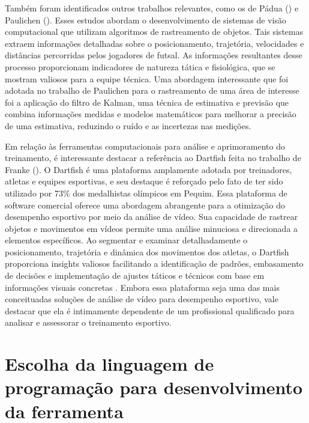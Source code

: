 Também foram identificados outros trabalhos relevantes, como os de Pádua (\citeyear{vcFutebol}) e Paulichen (\citeyear{futebolTatica}). Esses estudos abordam o desenvolvimento de sistemas de visão computacional que utilizam algoritmos de rastreamento de objetos. Tais sistemas extraem informações detalhadas sobre o posicionamento, trajetória, velocidades e distâncias percorridas pelos jogadores de futsal. As informações resultantes desse processo proporcionam indicadores de natureza tática e fisiológica, que se mostram valiosos para a equipe técnica. Uma abordagem interessante que foi adotada no trabalho de Paulichen para o rastreamento de uma área de interesse foi a aplicação do filtro de Kalman, uma técnica de estimativa e previsão que combina informações medidas e modelos matemáticos para melhorar a precisão de uma estimativa, reduzindo o ruído e as incertezas nas medições.

Em relação às ferramentas computacionais para análise e aprimoramento do treinamento, é interessante destacar a referência ao Dartfish feita no trabalho de Franke (\citeyear{vcBicicleta}). O Dartfish é uma plataforma amplamente adotada por treinadores, atletas e equipes esportivas, e seu destaque é reforçado pelo fato de ter sido utilizado por 73\% dos medalhistas olímpicos em Pequim. Essa plataforma de software comercial oferece uma abordagem abrangente para a otimização do desempenho esportivo por meio da análise de vídeo. Sua capacidade de rastrear objetos e movimentos em vídeos permite uma análise minuciosa e direcionada a elementos específicos. Ao segmentar e examinar detalhadamente o posicionamento, trajetória e dinâmica dos movimentos dos atletas, o Dartfish proporciona insights valiosos facilitando a identificação de padrões, embasamento de decisões e implementação de ajustes táticos e técnicos com base em informações visuais concretas \cite{dartfish}. Embora essa plataforma seja uma das mais conceituadas soluções de análise de vídeo para desempenho esportivo, vale destacar que ela é intimamente dependente de um profissional qualificado para analisar e assessorar o treinamento esportivo.



\section[Escolha da linguagem de programação para desenvolvimento da ferramenta]{Escolha da linguagem de programação para desenvolvimento da ferramenta}\label{sec:Escolha da linguagem de programacao para desenvolvimento da ferramenta}

